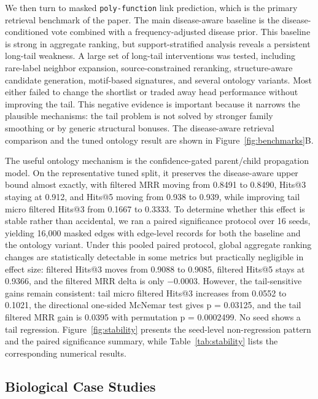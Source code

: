 \documentclass[11pt]{article}
\begin{document}
We then turn to masked \texttt{poly-function} link prediction, which is the primary retrieval benchmark of the paper. The main disease-aware baseline is the disease-conditioned vote combined with a frequency-adjusted disease prior. This baseline is strong in aggregate ranking, but support-stratified analysis reveals a persistent long-tail weakness. A large set of long-tail interventions was tested, including rare-label neighbor expansion, source-constrained reranking, structure-aware candidate generation, motif-based signatures, and several ontology variants. Most either failed to change the shortlist or traded away head performance without improving the tail. This negative evidence is important because it narrows the plausible mechanisms: the tail problem is not solved by stronger family smoothing or by generic structural bonuses. The disease-aware retrieval comparison and the tuned ontology result are shown in Figure~\ref{fig:benchmarks}B.

The useful ontology mechanism is the confidence-gated parent/child propagation model. On the representative tuned split, it preserves the disease-aware upper bound almost exactly, with filtered MRR moving from 0.8491 to 0.8490, Hits@3 staying at 0.912, and Hits@5 moving from 0.938 to 0.939, while improving tail micro filtered Hits@3 from 0.1667 to 0.3333. To determine whether this effect is stable rather than accidental, we ran a paired significance protocol over 16 seeds, yielding 16,000 masked edges with edge-level records for both the baseline and the ontology variant. Under this pooled paired protocol, global aggregate ranking changes are statistically detectable in some metrics but practically negligible in effect size: filtered Hits@3 moves from 0.9088 to 0.9085, filtered Hits@5 stays at 0.9366, and the filtered MRR delta is only $-0.0003$. However, the tail-sensitive gains remain consistent: tail micro filtered Hits@3 increases from 0.0552 to 0.1021, the directional one-sided McNemar test gives p = 0.03125, and the tail filtered MRR gain is 0.0395 with permutation p = 0.0002499. No seed shows a tail regression. Figure~\ref{fig:stability} presents the seed-level non-regression pattern and the paired significance summary, while Table~\ref{tab:stability} lists the corresponding numerical results.

\subsection{Biological Case Studies}
\label{sec:biological-case-studies}
\end{document}

